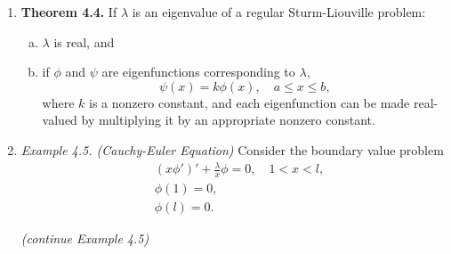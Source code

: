\begin{enumerate}
\item \textbf{Theorem 4.4.} If $\lambda$ is an eigenvalue of a regular Sturm-Liouville problem:

\begin{enumerate}[(a)]

\item $\lambda$ is real, and

\item if $\phi$ and $\psi$ are eigenfunctions corresponding to $\lambda$,
\[\psi(x)=k\phi(x), \quad a\leq x \leq b,\]
where $k$ is a nonzero constant, and each eigenfunction can be made real-valued by multiplying it by an appropriate nonzero constant.
\end{enumerate}



\item \textit{Example 4.5. (Cauchy-Euler Equation)}
Consider the boundary value problem
\begin{align*}
    & (x\phi ')'+ \frac{\lambda}{x}\phi = 0, \quad 1<x<l, \\
    & \phi(1) = 0, \\
    & \phi(l) = 0.
\end{align*}



\newpage

\textit{(continue Example 4.5)}


% 
% 
% 

\end{enumerate}

\newpage

